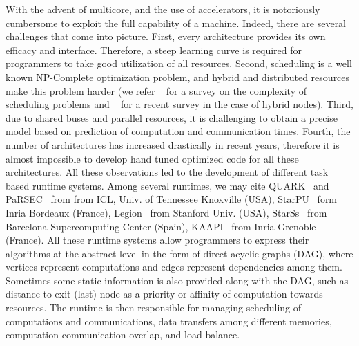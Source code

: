 \documentclass[sigconf]{acmart}
\begin{document}
	With the advent of multicore, and the use of accelerators, it is notoriously cumbersome to exploit the full capability of a machine. Indeed, there are several challenges that come into picture. First, every architecture provides its own efficacy and interface. Therefore, a steep learning curve is required for programmers to take good utilization of all resources. Second, scheduling is a well known NP-Complete optimization problem, and hybrid and distributed resources make this problem harder (we refer ~\cite{webpagescheduling} for a survey on the complexity of scheduling problems and ~\cite{bleuse2015scheduling} for a recent survey in the case of hybrid nodes). Third, due to shared buses and parallel resources, it is challenging to obtain a precise model based on prediction of computation and communication times. Fourth, the number of architectures has increased drastically in recent years, therefore it is almost impossible to develop hand tuned optimized code for all these architectures. All these observations led to the development of different task based runtime systems. Among several runtimes, we may cite QUARK~\cite{YarKhan:2011:Quark:Manual} and PaRSEC~\cite{parsec} from from ICL, Univ. of Tennessee Knoxville (USA), StarPU~\cite{starpu} form Inria Bordeaux (France), Legion~\cite{legion12} from Stanford Univ. (USA), StarSs~\cite{ompss} from Barcelona Supercomputing Center (Spain), KAAPI~\cite{kaapi} from Inria Grenoble (France). All these runtime systems allow programmers to express their algorithms at the abstract level in the form of direct acyclic graphs (DAG), where vertices represent computations and edges represent dependencies among them. Sometimes some static information is also provided along with the DAG, such as distance to exit (last) node as a priority or affinity of computation towards resources. The runtime is then responsible for managing scheduling of computations and communications, data transfers among different memories, computation-communication overlap, and load balance.
	
	
	
\end{document}
